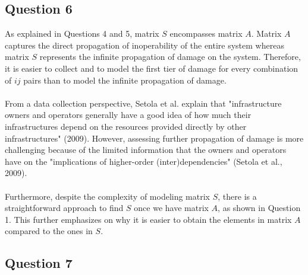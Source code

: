 \documentclass[11pt,a4paper]{article}
\begin{document}
\subsection*{Question 6}
As explained in Questions 4 and 5, matrix $S$ encompasses matrix $A$. Matrix $A$ captures the direct propagation of inoperability of the entire system whereas matrix $S$ represents the infinite propagation of damage on the system. Therefore, it is easier to collect and to model the first tier of damage for every combination of $ij$ pairs than to model the infinite propagation of damage.\\
\\
From a data collection perspective, Setola et al. explain that "infrastructure owners and operators generally have a good idea of how much their infrastructures depend on the resources provided directly by other infrastructures" (2009). However, assessing further propagation of damage is more challenging because of the limited information that the owners and operators have on the "implications of higher-order (inter)dependencies" (Setola et al., 2009). \\
\\
Furthermore, despite the complexity of modeling matrix $S$, there is a straightforward approach to find $S$ once we have matrix $A$, as shown in Question 1. This further emphasizes on why it is easier to obtain the elements in matrix $A$ compared to the ones in $S$.

\subsection*{Question 7}
\end{document}

